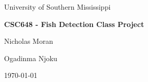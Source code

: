 \documentclass[11pt]{article}
\begin{document}
    \begin{titlepage}
      \centering
      {\Huge University of Southern Mississippi\par}
      \vspace{2cm}

      {\Huge\bfseries CSC648 - Fish Detection Class Project\par}
      \vspace{1.5cm}

      {\Huge Nicholas Moran\par}
      \vspace{0.5cm}
      {\Huge Ogadinma Njoku\par}
      \vspace{0.5cm}

      {\large \today \par}
      \vfill
    \end{titlepage}

    \tableofcontents
    
    \newpage

    
    
    
    
    
    
    
    

       
    
\end{document}
